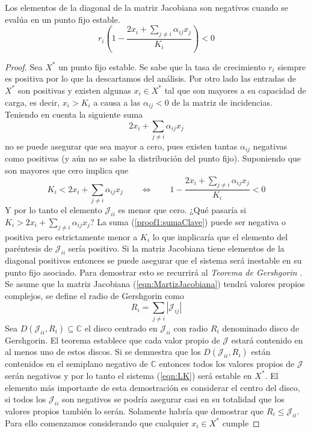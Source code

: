\begin{proposición}\label{prop:DiagonalI}
	Los elementos de la diagonal de la matriz Jacobiana son negativos cuando se evalúa en un punto fijo estable.
	$$
	r_i \left (1-\frac{2x_i+\sum_{j\neq i}\alpha_{ij}x_j}{K_i}\right )<0
	$$	
	\begin{proof}
		Sea $X^*$ un punto fijo estable. Se sabe que la tasa de crecimiento $r_i$ siempre es positiva por lo que la descartamos del análisis. Por otro lado las entradas de $X^*$ son positivas y existen algunas $x_i\in X^*$ tal que son mayores a su capacidad de carga, es decir, $x_i>K_i$ a causa a las $\alpha_{ij}<0$ de la matriz de incidencias. Teniendo en cuenta la siguiente suma
		\begin{equation}\label{proof1:sumaClave}
			2x_i+\sum_{j\neq i}\alpha_{ij}x_j
		\end{equation}
		no se puede asegurar que sea mayor a cero, pues existen tantas $\alpha_{ij}$ negativas como positivas (y aún no se sabe la distribución del punto fijo). Suponiendo que son mayores que cero implica que
		$$K_i<2x_i+\sum_{j\neq i}\alpha_{ij}x_j\qquad\Longleftrightarrow\qquad 1-\frac{2x_i+\sum_{j\neq i}\alpha_{ij}x_j}{K_i}<0$$
		Y por lo tanto el elemento $\mathcal{J}_{ii}$ es menor que cero. ¿Qué pasaría si $K_i>2x_i+\sum_{j\neq i}\alpha_{ij}x_j$? La suma (\ref{proof1:sumaClave}) puede ser negativa o positiva pero estrictamente menor a $K_i$ lo que implicaría que el elemento del paréntesis de $\mathcal{J}_{ii}$ sería positivo. Si la matriz Jacobiana tiene elementos de la diagonal positivos entonces se puede asegurar que el sistema será inestable en su punto fijo asociado. Para demostrar esto se recurrirá al \textit{Teorema de Gershgorin} \cite{GershgorinTheorem}. Se asume que la matriz Jacobiana (\ref{eqn:MartizJacobiana}) tendrá valores propios complejos, se define el radio de Gershgorin como
		$$R_i=\sum_{j\neq i}|\mathcal{J}_{ij}|$$
		Sea $D(\mathcal{J}_{ii},R_i)\subseteq\mathbb{C}$ el disco centrado en $\mathcal{J}_{ii}$ con radio $R_i$ denominado disco de Gershgorin. El teorema establece que cada valor propio de $\mathcal{J}$ estará contenido en al menos uno de estos discos. Si se demuestra que los $D(\mathcal{J}_{ii},R_i)$ están contenidos en el semiplano negativo de $\mathbb{C}$ entonces todos los valores propios de $\mathcal{J}$ serán negativos y por lo tanto el sistema (\ref{eqn:LK}) será estable en $X^*$. El elemento más importante de esta demostración es considerar el centro del disco, si todos los $\mathcal{J}_{ii}$ son negativos se podría asegurar casi en su totalidad que los valores propios también lo serán. Solamente habría que demostrar que $R_i\leq\mathcal{J}_{ii}$. Para ello comenzamos considerando que cualquier $x_i\in X^*$ cumple

\end{proof}
\end{proposición}
